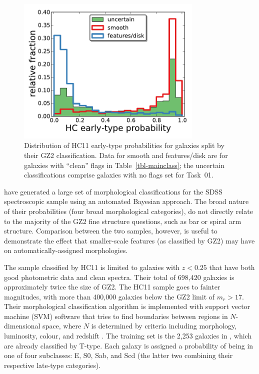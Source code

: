 \documentclass[useAMS,usenatbib]{mn2e}
\begin{document}
\begin{figure}
\includegraphics[angle=0,width=3.5in]{figures/hc_histogram.pdf}
\caption{Distribution of HC11 early-type probabilities for galaxies split by their GZ2 classification. Data for smooth and features/disk are for galaxies with ``clean'' flags in Table~\ref{tbl-mainclass}; the uncertain classifications comprise galaxies with no flags set for Task~01. 
\label{fig-hc_histogram}}
\end{figure}

\citet[][HC11]{hue11} have generated a large set of morphological classifications for the SDSS spectroscopic sample using an automated Bayesian approach. The broad nature of their probabilities (four broad morphological categories), do not directly relate to the majority of the GZ2 fine structure questions, such as bar or spiral arm structure. Comparison between the two samples, however, is useful to demonstrate the effect that smaller-scale features (as classified by GZ2) may have on automatically-assigned morphologies.

The sample classified by HC11 is limited to galaxies with $z<0.25$ that have both good photometric data and clean spectra. Their total of 698,420 galaxies is approximately twice the size of GZ2. The HC11 sample goes to fainter magnitudes, with more than 400,000 galaxies below the GZ2 limit of $m_r>17$. Their morphological classification algorithm is implemented with support vector machine (SVM) software that tries to find boundaries between regions in $N$-dimensional space, where $N$ is determined by criteria including morphology, luminosity, colour, and redshift \citep{hue08}. The training set is the 2,253 galaxies in \citet{fuk07}, which are already classified by T-type. Each galaxy is assigned a probability of being in one of four subclasses: E, S0, Sab, and Scd (the latter two combining their respective late-type categories). 
\end{document}
